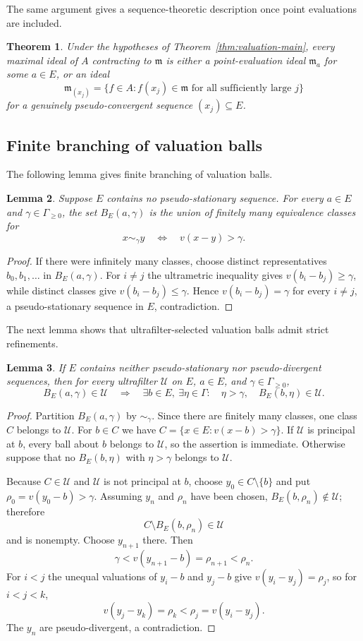 \documentclass[11pt]{amsart}
\newtheorem{theorem}{Theorem}[section]
\newtheorem{lemma}[theorem]{Lemma}
\theoremstyle{definition}
\theoremstyle{remark}
\newcommand{\U}{\mathcal U}
\newcommand{\g}{\Gamma}
\begin{document}
The same argument gives a sequence-theoretic description once point evaluations are included.
\begin{theorem}\label{thm:sequence}
Under the hypotheses of Theorem~\ref{thm:valuation-main}, every
maximal ideal of $A$ contracting to $\mathfrak m$ is either a point-evaluation
ideal $\mathfrak m_a$ for some $a\in E$, or an ideal
\[
\mathfrak m_{(x_j)}=\{f\in A:f(x_j)\in\mathfrak m\text{ for all sufficiently large }j\}
\]
for a genuinely pseudo-convergent sequence $(x_j)\subseteq E$.
\end{theorem}

\subsection{Finite branching of valuation balls}\label{sec:balls}


The following lemma gives finite branching of valuation balls.
\begin{lemma}\label{lem:branch}
Suppose $E$ contains no pseudo-stationary sequence. For every $a\in E$ and $\gamma\in\g_{\geq0}$, the set $B_E(a,\gamma)$ is the union of finitely many equivalence classes for
\[
 x\sim_\gamma y\quad\Longleftrightarrow\quad v(x-y)>\gamma.
\]
\end{lemma}
\begin{proof}
If there were infinitely many classes, choose distinct representatives $b_0,b_1,\ldots$ in $B_E(a,\gamma)$. For $i\ne j$ the ultrametric inequality gives $v(b_i-b_j)\geq\gamma$, while distinct classes give $v(b_i-b_j)\leq\gamma$. Hence $v(b_i-b_j)=\gamma$ for every $i\ne j$, a pseudo-stationary sequence in $E$, contradiction.
\end{proof}


The next lemma shows that ultrafilter-selected valuation balls admit strict refinements.
\begin{lemma}\label{lem:refine}
If $E$ contains neither pseudo-stationary nor pseudo-divergent sequences, then for every ultrafilter $\U$ on $E$, $a\in E$, and $\gamma\in\g_{\geq0}$,
\[
 B_E(a,\gamma)\in\U\quad\Longrightarrow\quad
 \exists b\in E,\ \exists\eta\in\g:\quad \eta>\gamma,\quad B_E(b,\eta)\in\U.
\]
\end{lemma}
\begin{proof}
Partition $B_E(a,\gamma)$ by $\sim_\gamma$. Since there are finitely many classes, one class $C$ belongs to $\U$. For $b\in C$ we have $C=\{x\in E:v(x-b)>\gamma\}$. If $\U$ is principal at $b$, every ball about $b$ belongs to $\U$, so the assertion is immediate. Otherwise suppose that no $B_E(b,\eta)$ with $\eta>\gamma$ belongs to $\U$.

Because $C\in\U$ and $\U$ is not principal at $b$, choose $y_0\in C\setminus\{b\}$ and put $\rho_0=v(y_0-b)>\gamma$. Assuming $y_n$ and $\rho_n$ have been chosen, $B_E(b,\rho_n)\notin\U$; therefore
\[
 C\setminus B_E(b,\rho_n)\in\U
\]
and is nonempty. Choose $y_{n+1}$ there. Then
\[
 \gamma<v(y_{n+1}-b)=\rho_{n+1}<\rho_n.
\]
For $i<j$ the unequal valuations of $y_i-b$ and $y_j-b$ give $v(y_i-y_j)=\rho_j$, so for $i<j<k$,
\[
 v(y_j-y_k)=\rho_k<\rho_j=v(y_i-y_j).
\]
The $y_n$ are pseudo-divergent, a contradiction.
\end{proof}
\end{document}
